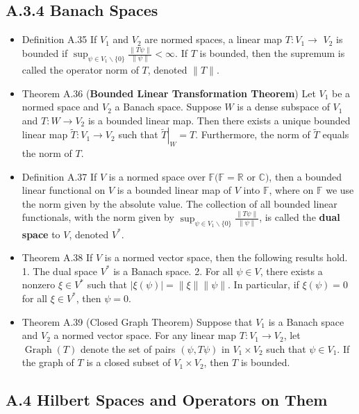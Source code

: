\subsection{A.3.4 Banach Spaces}
\begin{itemize}
\item Definition A.35 If $V_{1}$ and $V_{2}$ are normed spaces, a linear map $T: V_{1} \rightarrow$ $V_{2}$ is bounded if $\sup _{\psi \in V_{1} \backslash\{0\}} \frac{\|T \psi\|}{\|\psi\|}<\infty$. If $T$ is bounded, then the supremum is called the operator norm of $T$, denoted $\|T\|$.

\item Theorem A.36 (\textbf{Bounded Linear Transformation Theorem}) Let $V_{1}$ be a normed space and $V_{2}$ a Banach space. Suppose $W$ is a dense subspace of $V_{1}$ and $T: W \rightarrow V_{2}$ is a bounded linear map. Then there exists a unique bounded linear map $\tilde{T}: V_{1} \rightarrow V_{2}$ such that $\left.\tilde{T}\right|_{W}=T$. Furthermore, the norm of $\tilde{T}$ equals the norm of $T$.

\item Definition A.37 If $V$ is a normed space over $\mathbb{F}(\mathbb{F}=\mathbb{R}$ or $\mathbb{C})$, then a bounded linear functional on $V$ is a bounded linear map of $V$ into $\mathbb{F}$, where on $\mathbb{F}$ we use the norm given by the absolute value. The collection of all bounded linear functionals, with the norm given by $\sup _{\psi \in V_{1} \backslash\{0\}} \frac{\|T \psi\|}{\|\psi\|}$, is called the \textbf{dual space} to $V$, denoted $V^{*}$.

\item Theorem A.38 If $V$ is a normed vector space, then the following results hold.
1. The dual space $V^{*}$ is a Banach space.
2. For all $\psi \in V$, there exists a nonzero $\xi \in V^{*}$ such that $|\xi(\psi)|=\|\xi\|\|\psi\|$. In particular, if $\xi(\psi)=0$ for all $\xi \in V^{*}$, then $\psi=0$.

\item Theorem A.39 (Closed Graph Theorem) Suppose that $V_{1}$ is a Banach space and $V_{2}$ a normed vector space. For any linear map $T: V_{1} \rightarrow V_{2}$, let $\operatorname{Graph}(T)$ denote the set of pairs $(\psi, T \psi)$ in $V_{1} \times V_{2}$ such that $\psi \in V_{1}$. If the graph of $T$ is a closed subset of $V_{1} \times V_{2}$, then $T$ is bounded.
\end{itemize}

\subsection{A.4 Hilbert Spaces and Operators on Them}

